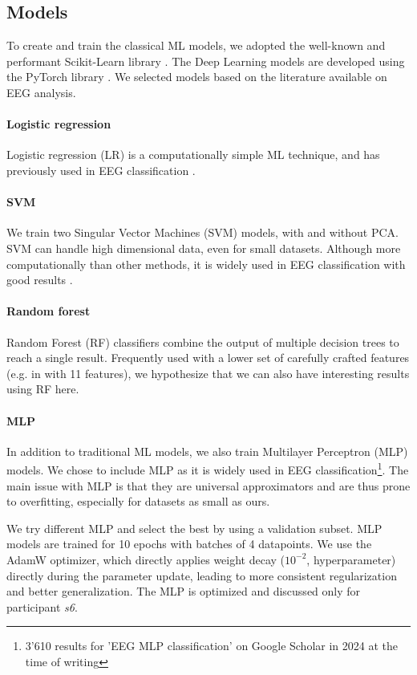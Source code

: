 \documentclass[10pt,conference,compsocconf]{IEEEtran}
\begin{document}
\subsection{Models}
To create and train the classical ML models, we adopted the well-known and performant Scikit-Learn library \cite{scikitlearn}. The Deep Learning models are developed using the PyTorch library \cite{pytorch}. We selected models based on the literature available on EEG analysis.

\paragraph{Logistic regression}
Logistic regression (LR) is a computationally simple ML technique, and has previously used in EEG classification \cite{SUBASI200587, NIPS2006_35937e34}.

\paragraph{SVM}
We train two Singular Vector Machines (SVM) models, with and without PCA. SVM can handle high dimensional data, even for small datasets. Although more computationally than other methods, it is widely used in EEG classification with good results \cite{knn_svm_review}.

\paragraph{Random forest}
Random Forest (RF) classifiers combine the output of multiple decision trees to reach a single result. Frequently used with a lower set of carefully crafted features (e.g. in \cite{eegrfclassif} with 11 features), we hypothesize that we can also have interesting results using RF here.

\paragraph{MLP}
In addition to traditional ML models, we also train Multilayer Perceptron (MLP) models. We chose to include MLP as it is widely used in EEG classification\footnote{3'610 results for 'EEG MLP classification' on Google Scholar in 2024 at the time of writing}. The main issue with MLP is that they are universal approximators and are thus prone to overfitting, especially for datasets as small as ours.

We try different MLP and select the best by using a validation subset. MLP models are trained for 10 epochs with batches of 4 datapoints. We use the AdamW optimizer, which directly applies weight decay (\(10^{-2}\), hyperparameter) directly during the parameter update, leading to more consistent regularization and better generalization. The MLP is optimized and discussed only for participant \textit{s6}.
\end{document}
